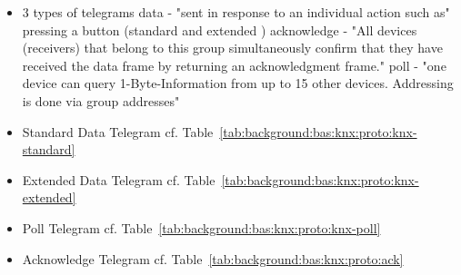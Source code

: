 	\begin{itemize}
		\item 3 types of telegrams \parencite{Hubner2009} \parencite{Merz2009}
			\subitem data - "sent in response to an individual action such as" \parencite{Merz2009} pressing a button (standard and extended \parencite{Hubner2009})
			\subitem acknowledge - "All devices (receivers) that belong to this group simultaneously confirm that they have received the data frame by returning an acknowledgment frame." \parencite{Merz2009}
			\subitem poll - "one device can query 1-Byte-Information from up to 15 other devices. Addressing is done via group addresses" \parencite{Hubner2009}
		\item Standard Data Telegram
			\subitem cf. Table~\ref{tab:background:bas:knx:proto:knx-standard}
		\item Extended Data Telegram
			\subitem cf. Table~\ref{tab:background:bas:knx:proto:knx-extended}
		\item Poll Telegram
			\subitem cf. Table~\ref{tab:background:bas:knx:proto:knx-poll}
		\item Acknowledge Telegram
			\subitem cf. Table~\ref{tab:background:bas:knx:proto:ack}
		
	\end{itemize}
	
